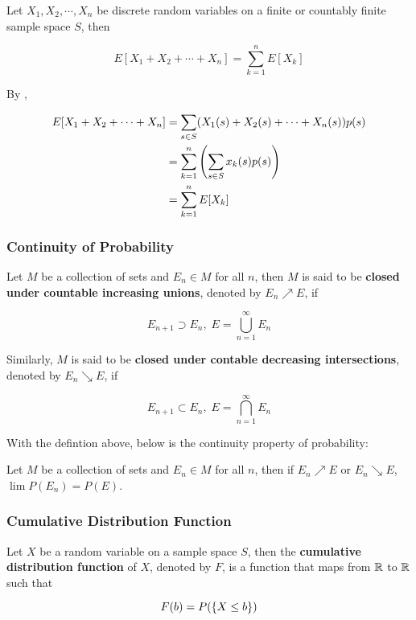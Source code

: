 \documentclass[a4paper,12pt]{article}
\begin{document}
\begin{pst}
  Let $X_{1},X_{2},\cdots,X_{n}$ be discrete random variables on a finite or countably finite sample space $S$, then

  $$E[X_{1}+X_{2}+\cdots+X_{n}]=\sum_{k=1}^{n}E[X_{k}]$$\s

  \prf By \rpst[\sctd{1}],

  $$\begin{aligned}[t]
    E[X_{1}+X_{2}+\cdots+X_{n}]&=\sum_{s\in S}(X_{1}(s)+X_{2}(s)+\cdots+X_{n}(s))p(s)\\
    &=\sum_{k=1}^{n}\left( \sum_{s\in S}x_{k}(s)p(s)\right)\\
    &=\sum_{k=1}^{n}E[X_{k}]
  \end{aligned}$$
\end{pst}\n

\subsubsection{Continuity of Probability}
\begin{dft}
  Let $M$ be a collection of sets and $E_{n}\in M$ for all $n$, then $M$ is said to be \textbf{closed under countable increasing unions}, denoted by $E_{n}\nearrow E$, if

  $$E_{n+1}\supset E_{n},\;E=\bigcup_{n=1}^{\infty}E_{n}$$\s

  Similarly, $M$ is said to be \textbf{closed under contable decreasing intersections}, denoted by $E_{n}\searrow E$, if

  $$E_{n+1}\subset E_{n},\;E=\bigcap_{n=1}^{\infty}E_{n}$$
\end{dft}\n

With the defintion above, below is the continuity property of probability:\n

\begin{pst}
  Let $M$ be a collection of sets and $E_{n}\in M$ for all $n$, then if $E_{n}\nearrow E$ or $E_{n}\searrow E$, $\lim P(E_{n})=P(E)$.
\end{pst}

\subsubsection{Cumulative Distribution Function}
\begin{dft}
  Let $X$ be a random variable on a sample space $S$, then the \textbf{cumulative distribution function} of $X$, denoted by $F$, is a function that maps from $\mathbb{R}$ to $\mathbb{R}$ such that

  $$F(b)=P(\left\{ X\leq b\right\})$$
\end{dft}\n
\end{document}
